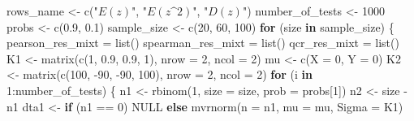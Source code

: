 \documentclass[
]{article}
\newenvironment{Shaded}{\begin{snugshade}}{\end{snugshade}}
\newcommand{\AttributeTok}[1]{\textcolor[rgb]{0.77,0.63,0.00}{#1}}
\newcommand{\ConstantTok}[1]{\textcolor[rgb]{0.00,0.00,0.00}{#1}}
\newcommand{\ControlFlowTok}[1]{\textcolor[rgb]{0.13,0.29,0.53}{\textbf{#1}}}
\newcommand{\DecValTok}[1]{\textcolor[rgb]{0.00,0.00,0.81}{#1}}
\newcommand{\FloatTok}[1]{\textcolor[rgb]{0.00,0.00,0.81}{#1}}
\newcommand{\FunctionTok}[1]{\textcolor[rgb]{0.00,0.00,0.00}{#1}}
\newcommand{\NormalTok}[1]{#1}
\newcommand{\OtherTok}[1]{\textcolor[rgb]{0.56,0.35,0.01}{#1}}
\newcommand{\SpecialCharTok}[1]{\textcolor[rgb]{0.00,0.00,0.00}{#1}}
\newcommand{\StringTok}[1]{\textcolor[rgb]{0.31,0.60,0.02}{#1}}
\begin{document}
\begin{Shaded}
\begin{Highlighting}[]
\NormalTok{rows\_name }\OtherTok{\textless{}{-}} \FunctionTok{c}\NormalTok{(}\StringTok{"$E(z)$"}\NormalTok{, }\StringTok{"$E(z\^{}2)$"}\NormalTok{, }\StringTok{"$D(z)$"}\NormalTok{)}
\NormalTok{number\_of\_tests }\OtherTok{\textless{}{-}} \DecValTok{1000}
\NormalTok{probs }\OtherTok{\textless{}{-}} \FunctionTok{c}\NormalTok{(}\FloatTok{0.9}\NormalTok{, }\FloatTok{0.1}\NormalTok{)}
\NormalTok{sample\_size }\OtherTok{\textless{}{-}} \FunctionTok{c}\NormalTok{(}\DecValTok{20}\NormalTok{, }\DecValTok{60}\NormalTok{, }\DecValTok{100}\NormalTok{)}
\ControlFlowTok{for}\NormalTok{ (size }\ControlFlowTok{in}\NormalTok{ sample\_size) \{}
\NormalTok{    pearson\_res\_mixt }\OtherTok{=} \FunctionTok{list}\NormalTok{()}
\NormalTok{    spearman\_res\_mixt }\OtherTok{=} \FunctionTok{list}\NormalTok{()}
\NormalTok{    qcr\_res\_mixt }\OtherTok{=} \FunctionTok{list}\NormalTok{()}
\NormalTok{    K1 }\OtherTok{\textless{}{-}} \FunctionTok{matrix}\NormalTok{(}\FunctionTok{c}\NormalTok{(}\DecValTok{1}\NormalTok{, }\FloatTok{0.9}\NormalTok{, }\FloatTok{0.9}\NormalTok{, }\DecValTok{1}\NormalTok{), }\AttributeTok{nrow =} \DecValTok{2}\NormalTok{, }\AttributeTok{ncol =} \DecValTok{2}\NormalTok{)}
\NormalTok{    mu }\OtherTok{\textless{}{-}} \FunctionTok{c}\NormalTok{(}\AttributeTok{X =} \DecValTok{0}\NormalTok{, }\AttributeTok{Y =} \DecValTok{0}\NormalTok{)}
\NormalTok{    K2 }\OtherTok{\textless{}{-}} \FunctionTok{matrix}\NormalTok{(}\FunctionTok{c}\NormalTok{(}\DecValTok{100}\NormalTok{, }\SpecialCharTok{{-}}\DecValTok{90}\NormalTok{, }\SpecialCharTok{{-}}\DecValTok{90}\NormalTok{, }\DecValTok{100}\NormalTok{), }\AttributeTok{nrow =} \DecValTok{2}\NormalTok{, }\AttributeTok{ncol =} \DecValTok{2}\NormalTok{)}
    \ControlFlowTok{for}\NormalTok{ (i }\ControlFlowTok{in} \DecValTok{1}\SpecialCharTok{:}\NormalTok{number\_of\_tests) \{}
\NormalTok{        n1 }\OtherTok{\textless{}{-}} \FunctionTok{rbinom}\NormalTok{(}\DecValTok{1}\NormalTok{, }\AttributeTok{size =}\NormalTok{ size, }\AttributeTok{prob =}\NormalTok{ probs[}\DecValTok{1}\NormalTok{])}
\NormalTok{        n2 }\OtherTok{\textless{}{-}}\NormalTok{ size }\SpecialCharTok{{-}}\NormalTok{ n1}
\NormalTok{        dta1 }\OtherTok{\textless{}{-}} \ControlFlowTok{if}\NormalTok{ (n1 }\SpecialCharTok{==} \DecValTok{0}\NormalTok{) }
            \ConstantTok{NULL} \ControlFlowTok{else} \FunctionTok{mvrnorm}\NormalTok{(}\AttributeTok{n =}\NormalTok{ n1, }\AttributeTok{mu =}\NormalTok{ mu, }\AttributeTok{Sigma =}\NormalTok{ K1)}

\end{Highlighting}
\end{Shaded}
\end{document}
